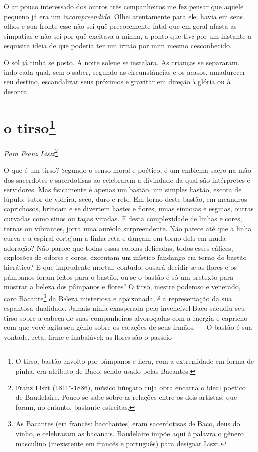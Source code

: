 O ar pouco interessado dos outros três companheiros me fez pensar
que aquele pequeno já era um \textit{incompreendido}. Olhei atentamente para ele;
havia em seus olhos e sua fronte esse não sei quê precocemente fatal
que em geral afasta as simpatias e não sei por quê excitava a
minha, a ponto que tive por um instante a esquisita ideia de que 
poderia ter um irmão por mim mesmo desconhecido.

O sol já tinha se posto. A noite solene se instalara. As crianças se
separaram, indo cada qual, sem o saber, segundo as circunstâncias e
os acasos, amadurecer seu destino, escandalizar seus próximos e
gravitar em direção à glória ou à desonra.

\quebra\section[O tirso]{o tirso\protect\footnote{  O tirso, bastão envolto por pâmpanos e hera, com a extremidade em
forma de pinha, era atributo de Baco, sendo usado pelas Bacantes.}}

\begin{flushright}
\textit{Para Franz Liszt}\protect\footnote{ Franz Liszt (1811"-1886), músico húngaro cuja obra encarna o ideal
poético de Baudelaire. Pouco se sabe sobre as relações entre os dois
artistas, que foram, no entanto, bastante estreitas.}
\end{flushright}\medskip

O que é um tirso? Segundo o senso moral e poético, é
um emblema sacro na mão dos sacerdotes e sacerdotisas ao celebrarem
a divindade da qual são intérpretes e servidores. Mas fisicamente é
apenas um bastão, um simples bastão, escora de lúpulo, tutor de
videira, seco, duro e reto. Em torno deste bastão, em meandros
caprichosos, brincam e se divertem hastes e flores, umas sinuosas e
esguias, outras curvadas como sinos ou taças viradas. E desta complexidade de linhas e cores, ternas ou
vibrantes, jorra uma auréola surpreendente. Não parece até que a linha curva e a espiral cortejam a
linha reta e dançam em torno dela em muda adoração? Não parece que
todas essas corolas delicadas, todos esses cálices, explosões de odores
e cores, executam um místico fandango em torno do bastão hierático? E
que imprudente mortal, contudo, ousará decidir se as flores e os
pâmpanos foram feitos para o bastão, ou se o bastão é só um pretexto
para mostrar a beleza dos pâmpanos e flores? O tirso, mestre poderoso e
venerado, caro Bacante\protect\footnote{  As Bacantes (em francês: bacchantes) eram sacerdotisas de Baco, deus do vinho, e celebravam as
bacanais. Baudelaire impõe aqui à palavra o gênero masculino (inexistente em francês e português) para designar Liszt.} da Beleza misteriosa e
apaixonada, é a
representação da sua espantosa dualidade. Jamais ninfa exasperada pelo invencível Baco sacudiu seu
tirso sobre a cabeça de suas companheiras alvoroçadas com a
energia e capricho com que você agita seu gênio sobre os corações de
seus irmãos. --- O bastão é sua vontade, reta, firme e inabalável; as
flores são o passeio

